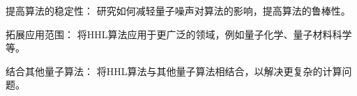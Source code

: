 \documentclass[aps,prl,twocolumn,groupedaddress]{revtex4-2}
\begin{document}
提高算法的稳定性： 研究如何减轻量子噪声对算法的影响，提高算法的鲁棒性。

拓展应用范围： 将HHL算法应用于更广泛的领域，例如量子化学、量子材料科学等。

结合其他量子算法： 将HHL算法与其他量子算法相结合，以解决更复杂的计算问题。


%



%
\end{document}
